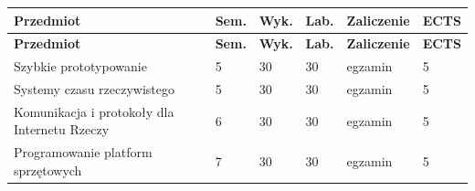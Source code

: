 \documentclass[12pt,a4paper]{article}
\newcommand{\thdrule}{\noalign{\global\setlength{\extrarowheight}{0pt}}}
\newcommand{\thdend}{\noalign{\global\setlength{\extrarowheight}{4pt}}}
\begin{document}
{\scriptsize
\begin{longtable}{m{6.5cm}m{0.7cm}m{1cm}m{1cm}m{1.7cm}m{0.7cm}}
\thdrule\toprule
\rowcolor{pjatkRed}
{\color{white}\footnotesize\textbf{\vphantom{Ag}Przedmiot}} & {\color{white}\footnotesize\textbf{\vphantom{Ag}Sem.}} & {\color{white}\footnotesize\textbf{\vphantom{Ag}Wyk.}} & {\color{white}\footnotesize\textbf{\vphantom{Ag}Lab.}} & {\color{white}\footnotesize\textbf{\vphantom{Ag}Zaliczenie}} & {\color{white}\footnotesize\textbf{\vphantom{Ag}ECTS}} \\
\midrule\thdend
\endfirsthead
\thdrule\toprule
\rowcolor{pjatkRed}
{\color{white}\footnotesize\textbf{\vphantom{Ag}Przedmiot}} & {\color{white}\footnotesize\textbf{\vphantom{Ag}Sem.}} & {\color{white}\footnotesize\textbf{\vphantom{Ag}Wyk.}} & {\color{white}\footnotesize\textbf{\vphantom{Ag}Lab.}} & {\color{white}\footnotesize\textbf{\vphantom{Ag}Zaliczenie}} & {\color{white}\footnotesize\textbf{\vphantom{Ag}ECTS}} \\
\midrule\thdend
\endhead
\rowcolor{tableRowLight} Szybkie prototypowanie & 5 & 30 & 30 & {\scriptsize egzamin} & 5 \\
\rowcolor{tableRowAlt} Systemy czasu rzeczywistego & 5 & 30 & 30 & {\scriptsize egzamin} & 5 \\
\rowcolor{tableRowLight} Komunikacja i protokoły dla Internetu Rzeczy & 6 & 30 & 30 & {\scriptsize egzamin} & 5 \\
\rowcolor{tableRowAlt} Programowanie platform sprzętowych & 7 & 30 & 30 & {\scriptsize egzamin} & 5 \\
\bottomrule
\end{longtable}}
\end{document}
